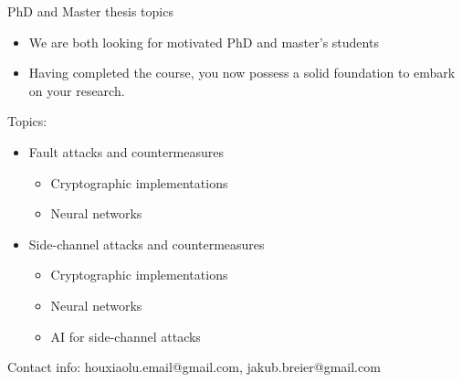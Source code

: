 \documentclass[aspectratio=169]{beamer}
\begin{document}
\begin{frame}{PhD and Master thesis topics}
\begin{itemize}
    \item We are both looking for motivated PhD and master's students
    \item Having completed the course, you now possess a solid foundation to embark on your research.
\end{itemize}
Topics:
    \begin{itemize}
        \item Fault attacks and countermeasures
        \begin{itemize}
            \item Cryptographic implementations
            \item Neural networks
        \end{itemize}
        \item Side-channel attacks and countermeasures
        \begin{itemize}
            \item Cryptographic implementations
            \item Neural networks
            \item AI for side-channel attacks
        \end{itemize}
    \end{itemize}
\vfill

Contact info: houxiaolu.email@gmail.com, jakub.breier@gmail.com
\end{frame}
\end{document}
